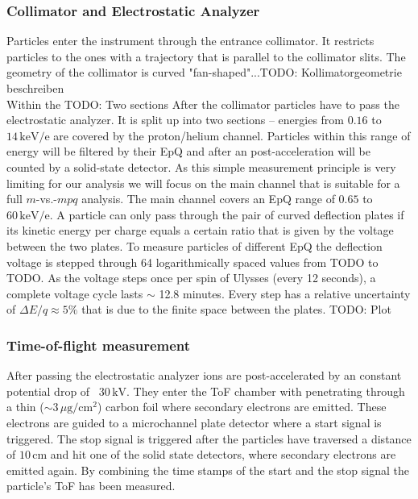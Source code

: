 \subsubsection{Collimator and Electrostatic Analyzer}
Particles enter the instrument through the entrance collimator. It restricts particles to the ones with a trajectory that is parallel to the collimator slits. The geometry of the collimator is curved "fan-shaped"...TODO: Kollimatorgeometrie beschreiben \\
Within the TODO: Two sections
After the collimator particles have to pass the electrostatic analyzer. It is split up into two sections -- energies from $0.16$ to $14\,\mathrm{keV/e}$ are covered by the proton/helium channel. Particles within this range of energy will be filtered by their EpQ and after an post-acceleration will be counted by a solid-state detector. 
As this simple measurement principle is very limiting for our analysis we will focus on the main channel that is suitable for a full $m$-vs.-$mpq$ analysis.
The main channel covers an EpQ range of $0.65$ to $60\,\mathrm{keV/e}$. A particle can only pass through the pair of curved deflection plates if its kinetic energy per charge equals a certain ratio that is given by the voltage between the two plates. To measure particles of different EpQ the deflection voltage is stepped through 64 logarithmically spaced values from TODO to TODO. As the voltage steps once per spin of Ulysses (every 12 seconds), a complete voltage cycle lasts $\sim$ 12.8 minutes. 
Every step has a relative uncertainty of $\Delta E/q \approx 5\%$ that is due to the finite space between the plates. TODO: Plot
  
\subsubsection{Time-of-flight measurement}
After passing the electrostatic analyzer ions are post-accelerated by an constant potential drop of ~$30\,\mathrm{kV}$. They enter the ToF chamber with penetrating through a thin ($\sim 3\,\mu \mathrm{g / cm^2}$) carbon foil where secondary electrons are emitted. These electrons are guided to a microchannel plate detector where a start signal is triggered. The stop signal is triggered after the particles have traversed a distance of $10\,\mathrm{cm}$ and hit one of the solid state detectors, where secondary electrons are emitted again. By combining the time stamps of the start and the stop signal the particle's ToF has been measured.
